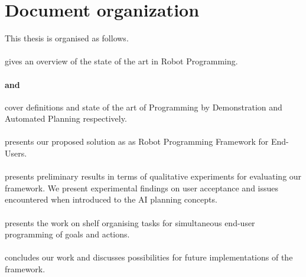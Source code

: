 \section{Document organization}
This thesis is organised as follows. 

\paragraph{} gives an overview of the state of the art in Robot Programming.

\paragraph{ and } cover definitions and state of the art of Programming by Demonstration and Automated Planning respectively.

\paragraph{} presents our proposed solution as as Robot Programming Framework for End-Users.


\paragraph{} presents preliminary results in terms of qualitative experiments for evaluating our framework. We present experimental findings on user acceptance and issues encountered when introduced to the AI planning concepts.

\paragraph{} presents the work on shelf organising tasks for simultaneous end-user programming of goals and actions.

\paragraph{} concludes our work and discusses possibilities for future implementations of the framework.

